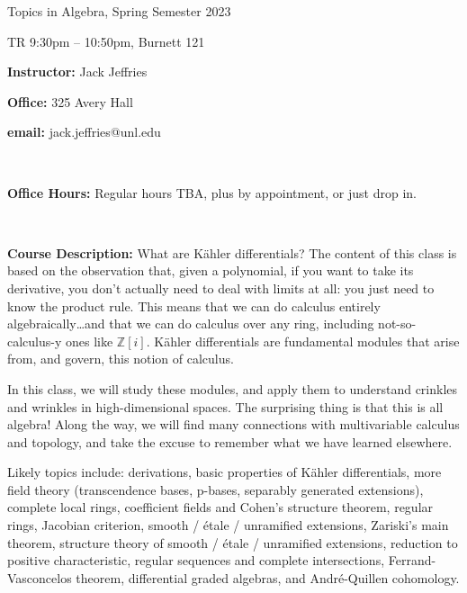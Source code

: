 \documentclass{amsart}
\begin{document}
 








\centerline{\bigbf Topics in Algebra, Spring Semester 2023}
\centerline{\bigbf TR 9:30pm -- 10:50pm, Burnett 121}



\bigskip

\noindent
{\bf Instructor:}  Jack Jeffries

\noindent
{\bf Office:} 325 Avery Hall

\noindent
{\bf email:} jack.jeffries@unl.edu

\

\noindent
{\bf Office Hours:} Regular hours TBA, plus by appointment, or just drop in.

\

\noindent
{\bf Course Description:} 
What are K\"ahler differentials? The content of this class is based on the observation that, given a polynomial, if you want to take its derivative, you don’t actually need to deal with limits at all: you just need to know the product rule. This means that we can do calculus entirely algebraically\dots and that we can do calculus over any ring, including not-so-calculus-y ones like $\mathbb{Z}[i]$. K\"ahler differentials are fundamental modules that arise from, and govern, this notion of calculus.

In this class, we will study these modules, and apply them to understand crinkles and wrinkles in high-dimensional spaces. The surprising thing is that this is all algebra! Along the way, we will find many connections with multivariable calculus and topology, and take the excuse to remember what we have learned elsewhere.

Likely topics include: derivations, basic properties of K\"ahler differentials, more field theory (transcendence bases, p-bases, separably generated extensions), complete local rings, coefficient fields and Cohen’s structure theorem, regular rings, Jacobian criterion, smooth / \'etale / unramified extensions, Zariski’s main theorem, structure theory of smooth / \'etale / unramified extensions, reduction to positive characteristic, regular sequences and complete intersections, Ferrand-Vasconcelos theorem, differential graded algebras, and Andr\'e-Quillen cohomology.
\end{document}
